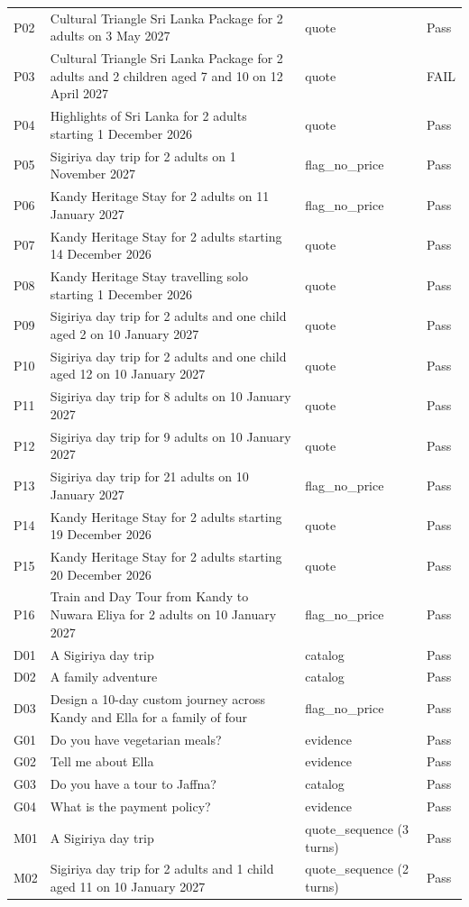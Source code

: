 \documentclass[11pt]{article}
\begin{document}
\begin{longtable}{@{}p{.08\linewidth}p{.56\linewidth}p{.18\linewidth}p{.09\linewidth}@{}}
P02&Cultural Triangle Sri Lanka Package for 2 adults on 3 May 2027&quote&Pass\\
P03&Cultural Triangle Sri Lanka Package for 2 adults and 2 children aged 7 and 10 on 12 April 2027&quote&FAIL\\
P04&Highlights of Sri Lanka for 2 adults starting 1 December 2026&quote&Pass\\
P05&Sigiriya day trip for 2 adults on 1 November 2027&flag\_no\_price&Pass\\
P06&Kandy Heritage Stay for 2 adults on 11 January 2027&flag\_no\_price&Pass\\
P07&Kandy Heritage Stay for 2 adults starting 14 December 2026&quote&Pass\\
P08&Kandy Heritage Stay travelling solo starting 1 December 2026&quote&Pass\\
P09&Sigiriya day trip for 2 adults and one child aged 2 on 10 January 2027&quote&Pass\\
P10&Sigiriya day trip for 2 adults and one child aged 12 on 10 January 2027&quote&Pass\\
P11&Sigiriya day trip for 8 adults on 10 January 2027&quote&Pass\\
P12&Sigiriya day trip for 9 adults on 10 January 2027&quote&Pass\\
P13&Sigiriya day trip for 21 adults on 10 January 2027&flag\_no\_price&Pass\\
P14&Kandy Heritage Stay for 2 adults starting 19 December 2026&quote&Pass\\
P15&Kandy Heritage Stay for 2 adults starting 20 December 2026&quote&Pass\\
P16&Train and Day Tour from Kandy to Nuwara Eliya for 2 adults on 10 January 2027&flag\_no\_price&Pass\\
D01&A Sigiriya day trip&catalog&Pass\\
D02&A family adventure&catalog&Pass\\
D03&Design a 10-day custom journey across Kandy and Ella for a family of four&flag\_no\_price&Pass\\
G01&Do you have vegetarian meals?&evidence&Pass\\
G02&Tell me about Ella&evidence&Pass\\
G03&Do you have a tour to Jaffna?&catalog&Pass\\
G04&What is the payment policy?&evidence&Pass\\
M01&A Sigiriya day trip&quote\_sequence (3 turns)&Pass\\
M02&Sigiriya day trip for 2 adults and 1 child aged 11 on 10 January 2027&quote\_sequence (2 turns)&Pass\\

\end{longtable}
\end{document}
